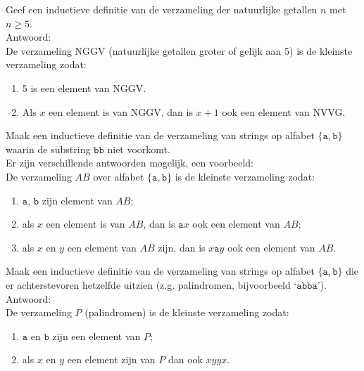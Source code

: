 \begin{answer} %
Geef een inductieve definitie van de verzameling der natuurlijke getallen $n$ met $n\geq 5$.\\[2.5pt]

Antwoord:\\
De verzameling NGGV (natuurlijke getallen groter of gelijk aan 5) is de kleinste verzameling zodat:
\begin{enumerate}[label=\roman*.]
\item 5 is een element van NGGV.
\item Als $x$ een element is van NGGV, dan is $x+1$ ook een element van NVVG.
\end{enumerate}
\end{answer}

\begin{answer} %
Maak een inductieve definitie van de verzameling van strings op alfabet $\{\mathtt{a},\mathtt{b}\}$ waarin de substring $\mathtt{bb}$ niet voorkomt.\\[2.5pt]

Er zijn verschillende antwoorden mogelijk, een voorbeeld:\\
De verzameling $AB$ over alfabet $\mathtt{\{a, b\}}$ is de kleinste verzameling zodat:
\begin{enumerate}[label=\roman*.]
\item $\mathtt{a}$, $\mathtt{b}$ zijn element van $AB$;
\item als $x$ een element is van $AB$, dan is $\mathtt{a}x$ ook een element van $AB$;
\item als $x$ en $y$ een element van $AB$ zijn, dan is $x\mathtt{a}y$ ook een element van $AB$.
\end{enumerate}
\end{answer}

\begin{answer} %
Maak een inductieve definitie van de verzameling van strings op alfabet $\{\mathtt{a},\mathtt{b}\}$ die er achterstevoren hetzelfde uitzien (z.g. palindromen, bijvoorbeeld `$\mathtt{abba}$').\\[2.5pt]

Antwoord:\\
De verzameling $P$ (palindromen) is de kleinste verzameling zodat:
\begin{enumerate}[label=\roman*.]
    \item $\mathtt{a}$ en $\mathtt{b}$ zijn een element van $P$;
    \item als $x$ en $y$ een element zijn van $P$ dan ook $xyyx$.
\end{enumerate}
\end{answer}

